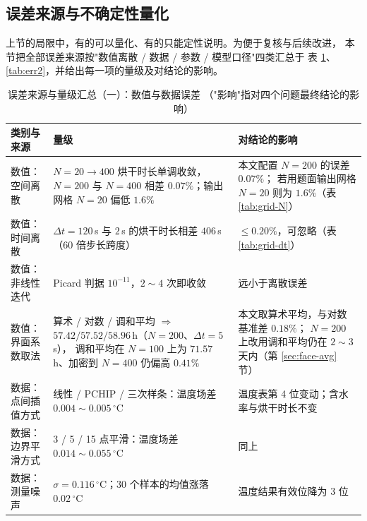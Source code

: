 \documentclass[12pt,a4paper,fontset=none]{ctexart}
\begin{document}
\subsection{误差来源与不确定性量化}
\label{sec:errorbudget}

上节的局限中，有的可以量化、有的只能定性说明。为便于复核与后续改进，
本节把全部误差来源按"数值离散 / 数据 / 参数 / 模型口径"四类汇总于
表 \ref{tab:err}、\ref{tab:err2}，并给出每一项的量级及对结论的影响。

\begin{table}[htbp]
  \centering
  \caption{误差来源与量级汇总（一）：数值与数据误差
    （"影响"指对四个问题最终结论的影响）}
  \label{tab:err}
  \small
  \begin{tabular}{p{2.6cm}p{5.2cm}p{6.2cm}}
    \toprule
    类别与来源 & 量级 & 对结论的影响 \\
    \midrule
    数值：空间离散 & $N=20\to400$ 烘干时长单调收敛，
      $N=200$ 与 $N=400$ 相差 $0.07\%$；输出网格 $N=20$ 偏低 $1.6\%$
      & 本文配置 $N=200$ 的误差 $0.07\%$；
        若用题面输出网格 $N=20$ 则为 $1.6\%$（表 \ref{tab:grid-N}） \\
    数值：时间离散 & $\Delta t=120$\,s 与 $2$\,s 的烘干时长相差
      $406$\,s（$60$ 倍步长跨度）
      & $\le0.20\%$，可忽略（表 \ref{tab:grid-dt}） \\
    数值：非线性迭代 & Picard 判据 $10^{-11}$，$2\sim4$ 次即收敛
      & 远小于离散误差 \\
    数值：界面系数取法 & 算术 / 对数 / 调和平均 $\Rightarrow$
      $57.42/57.52/58.96$\,h（$N=200$、$\Delta t=5$\,s），
      调和平均在 $N=100$ 上为 $71.57$\,h、加密到 $N=400$ 仍偏高 $0.41\%$
      & 本文取算术平均，与对数基准差 $0.18\%$；
        $N=200$ 上改用调和平均仍在 $2\sim3$ 天内（第 \ref{sec:face-avg} 节） \\
    \midrule
    数据：点间插值方式 & 线性 / PCHIP / 三次样条：温度场差
      $0.004\sim0.005\,^\circ$C
      & 温度表第 4 位变动；含水率与烘干时长不变 \\
    数据：边界平滑方式 & 3 / 5 / 15 点平滑：温度场差
      $0.014\sim0.055\,^\circ$C & 同上 \\
    数据：测量噪声 & $\sigma=0.116\,^\circ$C；30 个样本的均值涨落
      $0.02\,^\circ$C & 温度结果有效位降为 3 位 \\
    \bottomrule
  \end{tabular}
\end{table}
\end{document}
